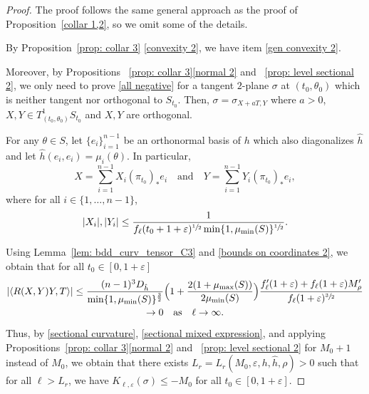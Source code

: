 \documentclass[JEP,XML,SOM,Unicode,NoFloatCountersInSection]{cedram}
\theoremstyle{definition}
\let\eps\varepsilon
\renewcommand{\>}{{\rangle}}
\newcommand{\<}{{\langle}}
\begin{document}
\begin{proof}
The proof follows the same general approach as the proof of Proposition~\ref{collar 1,2}, so we omit some of the details.

By Proposition~\ref{prop: collar 3} \eqref{convexity 2}, we have item \eqref{gen convexity 2}.

Moreover, by Propositions ~\ref{prop: collar 3}\eqref{normal 2} and ~\ref{prop: level sectional 2}, we only need to prove \ref{all negative} for a tangent $2$\nobreakdash-plane $\sigma$ at $(t_0,\theta_0)$ which is neither tangent nor orthogonal to $S_{t_0}$. Then, $\sigma=\sigma_{X+aT, Y}$ where $a>0$, $X,Y\in T^1_{(t_0,\theta_0)}S_{t_0}$ and $X,Y$ are orthogonal.

For any $\theta\in S$, let $\{e_i\}_{i=1}^{n-1}$ be an orthonormal basis of $h$ which also diagonalizes $\hat h$ and let $\hat h(e_i,e_i)=\mu_i(\theta)$.
In particular,
\[
X=\sum_{i=1}^{n-1}X_i(\pi_{t_0})_*e_i\quad\text{and}\quad Y=\sum_{i=1}^{n-1}Y_i(\pi_{t_0})_*e_i,
\]
where for all $i\in\{1,\ldots,n-1\}$,
\begin{equation}\label{bounds on coordinates 2}
|X_i|,|Y_i|\leq \frac{1}{f_\ell(t_0+1+\eps)^{\sfrac{1}{2}}\min\{1,\mu_{\min}(S)\}^{\sfrac{1}{2}}}.
\end{equation}

Using Lemma~\ref{lem: bdd_curv_tensor_C3} and \eqref{bounds on coordinates 2}, we obtain that for all $t_0\in[0,1+\eps]$
\begin{multline*}
\left|\langle R(X,Y)Y,T\rangle\right| \leq \frac{(n-1)^3D_{\hat h}}{\min\{1,\mu_{\min}(S)\}^\frac{3}{2}}\Bigl(1+\frac{2(1+\mu_{\max}(S))}{2\mu_{\min}(S)}\Bigr)\frac{f'_\ell(1+\eps)+f_\ell(1+\eps)M'_\rho}{f_\ell(1+\eps)^{\sfrac{3}{2}}}\\
\to 0 \quad \text{as}\quad \ell\to\infty.
\end{multline*}

Thus, by \eqref{sectional curvature}, \eqref{sectional mixed expression}, and applying Propositions~\ref{prop: collar 3}\eqref{normal 2} and ~\ref{prop: level sectional 2} for $M_0+1$ instead of $M_0$, we obtain that there exists $L_r=L_r(M_0, \eps, h, \hat h, \rho)>0$ such that for all $\ell>L_r$, we have $K_{\ell,\eps}(\sigma)\leq -M_0$ for all $t_0\in[0,1+\eps]$.
\end{proof}

\end{document}

